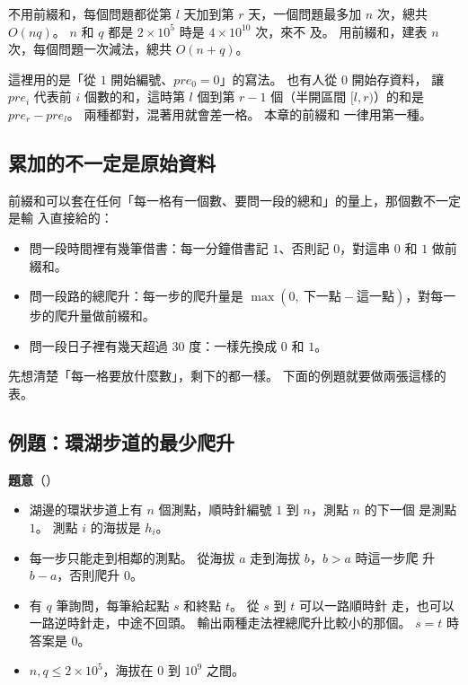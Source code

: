 
不用前綴和，每個問題都從第 $l$ 天加到第 $r$ 天，一個問題最多加 $n$ 次，總共
$O(nq)$。 $n$ 和 $q$ 都是 $2 \times 10^5$ 時是 $4 \times 10^{10}$ 次，來不
及。 用前綴和，建表 $n$ 次，每個問題一次減法，總共 $O(n + q)$。

這裡用的是「從 $1$ 開始編號、$pre_0 = 0$」的寫法。 也有人從 $0$ 開始存資料，
讓 $pre_i$ 代表前 $i$ 個數的和，這時第 $l$ 個到第 $r - 1$ 個（半開區間
$[l, r)$）的和是 $pre_r - pre_l$。 兩種都對，混著用就會差一格。 本章的前綴和
一律用第一種。

\subsection{累加的不一定是原始資料}

前綴和可以套在任何「每一格有一個數、要問一段的總和」的量上，那個數不一定是輸
入直接給的：

\begin{itemize}
\item 問一段時間裡有幾筆借書：每一分鐘借書記 $1$、否則記 $0$，對這串 $0$ 和
$1$ 做前綴和。
\item 問一段路的總爬升：每一步的爬升量是 $\max(0,\ \text{下一點} -
\text{這一點})$，對每一步的爬升量做前綴和。
\item 問一段日子裡有幾天超過 $30$ 度：一樣先換成 $0$ 和 $1$。
\end{itemize}

先想清楚「每一格要放什麼數」，剩下的都一樣。 下面的例題就要做兩張這樣的表。

\subsection{例題：環湖步道的最少爬升}
\label{sec:ps-ex-trail}

\textbf{題意}（）

\begin{itemize}
\item 湖邊的環狀步道上有 $n$ 個測點，順時針編號 $1$ 到 $n$，測點 $n$ 的下一個
是測點 $1$。 測點 $i$ 的海拔是 $h_i$。
\item 每一步只能走到相鄰的測點。 從海拔 $a$ 走到海拔 $b$，$b > a$ 時這一步爬
升 $b - a$，否則爬升 $0$。
\item 有 $q$ 筆詢問，每筆給起點 $s$ 和終點 $t$。 從 $s$ 到 $t$ 可以一路順時針
走，也可以一路逆時針走，中途不回頭。 輸出兩種走法裡總爬升比較小的那個。
$s = t$ 時答案是 $0$。
\item $n, q \le 2 \times 10^5$，海拔在 $0$ 到 $10^9$ 之間。
\end{itemize}

